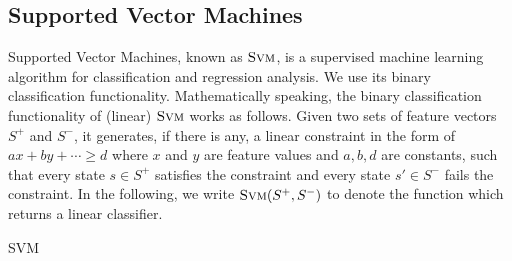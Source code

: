 \subsection{Supported Vector Machines}

Supported Vector Machines, known as $\textsc{Svm}$, is a supervised machine learning algorithm for classification and regression analysis. 
We use its binary classification functionality. 
Mathematically speaking, the binary classification functionality of (linear) $\textsc{Svm}$ works as follows. 
Given two sets of feature vectors $S^+$ and $S^-$, it generates, if there is any, 
a linear constraint in the form of $ax + by + \cdots \geq d$ where $x$ and $y$ are feature values and $a, b, d$ are constants, 
such that every state $s \in S^+$ satisfies the constraint and every state $s' \in S^-$ fails the constraint. 
In the following, we write $\textsc{Svm}(S^+, S^-)$ to denote the function which returns a linear classifier.

SVM

